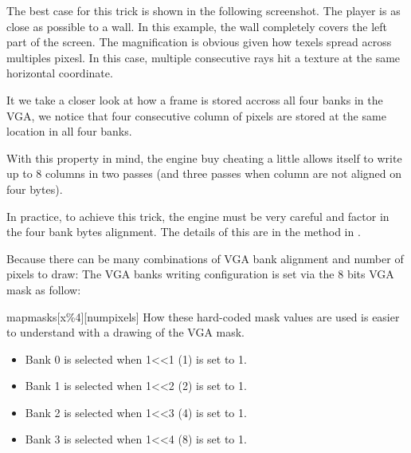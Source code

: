 \par
The best case for this trick is shown in the following screenshot. The player is as close as possible to a wall. In this example, the wall completely covers the left part of the screen. The magnification is obvious given how texels spread across multiples pixesl. In this case, multiple consecutive rays hit a texture at the same horizontal coordinate.\\
\begin{figure}[H]
 \centering
\end{figure}
It we take a closer look at how a frame is stored accross all four banks in the VGA, we notice that four consecutive column of pixels are stored at the same location in all four banks.\\
\par
With this property in mind, the engine buy cheating a little allows itself to write up to 8 columns in two passes (and three passes when column are not aligned on four bytes).
 \par
  \begin{minipage}{\textwidth}
 
\centering
\vspace*{0.5cm}
\centering


 \end{minipage}

\par

In practice, to achieve this trick, the engine must be very careful and factor in the four bank bytes alignment. The details of this are in the method  in .\\
\par 
\begin{minipage}{\textwidth}

\end{minipage}
Because there can be many combinations of VGA bank alignment and number of pixels to draw:
The VGA banks writing configuration is set via the 8 bits VGA mask as follow:\\
\par
 \par
 \begin{minipage}{\textwidth}

\end{minipage}
mapmasks[x\%4][numpixels]
How these hard-coded mask values are used is easier to understand with a drawing of the VGA mask. 
\begin{itemize}
\item Bank 0 is selected when 1<<1 (1) is set to 1.
\item Bank 1 is selected when 1<<2 (2) is set to 1.
\item Bank 2 is selected when 1<<3 (4) is set to 1.
\item Bank 3 is selected when 1<<4 (8) is set to 1.
\end{itemize}
\par


